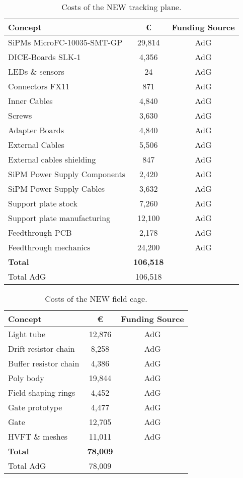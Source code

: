 \begin{table}[h!]
\begin{center}
\begin{tabular}{|l|c|c|}
\hline
 Concept & \euro & Funding Source \\
 \hline
SiPMs MicroFC-10035-SMT-GP &	29,814 & AdG \\
DICE-Boards SLK-1	&	4,356 & AdG \\
LEDs \& sensors	&	24 & AdG \\
Connectors FX11	&	871 & AdG \\
Inner Cables	&	4,840 & AdG \\
Screws	&	3,630 & AdG \\
Adapter Boards &	4,840 & AdG \\
External Cables &	5,506 & AdG \\
External cables shielding	&	847 & AdG \\
SiPM Power Supply Components	& 2,420 & AdG \\
SiPM Power Supply Cables	& 3,632 & AdG \\
Support plate stock	& 7,260 & AdG \\
Support plate manufacturing  & 12,100 &  AdG \\
 Feedthrough PCB	&	2,178 & AdG \\
Feedthrough mechanics &	 24,200 & AdG \\
  \hline
{\bf Total}	&	{\bf 106,518}	& \\
  Total AdG	&	106,518 	& \\
 \hline\hline
\end{tabular}  
\caption{Costs of the NEW tracking plane.}
\label{tab.new:TP}
\end{center}
\end{table} 

\begin{table}[h!]
\begin{center}
\begin{tabular}{|l|c|c|}
\hline
 Concept & \euro & Funding Source \\
 \hline
 Light tube & 12,876 & AdG \\
 Drift resistor chain & 8,258 & AdG \\
 Buffer resistor chain & 4,386 & AdG\\
 Poly body & 19,844 & AdG \\
 Field shaping rings & 4,452 & AdG \\
 Gate prototype & 4,477 & AdG \\
 Gate & 12,705 & AdG \\
 HVFT \& meshes & 11,011 & AdG \\
  \hline
{\bf Total} &	{\bf 78,009}	& \\
  Total AdG	&	78,009	& \\
 \hline\hline
\end{tabular}  
\caption{Costs of the NEW field cage.}
\label{tab.new:FC}
\end{center}
\end{table} 

